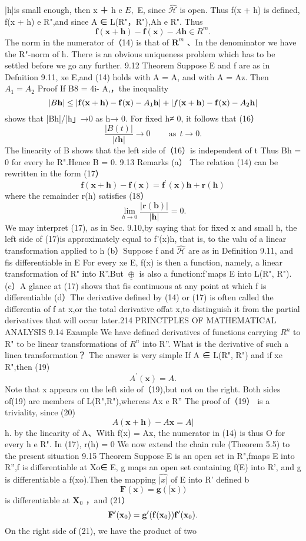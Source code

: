 |h|is small enough, then x ＋ h e $\textstyle E,$ E, since ${\widehat{\mathcal{H}}}$ is open. Thus f(x + h) is defined, f(x + h) e R",and since A ∈ L(R"，R"),Ah e R". Thus $$ \mathbf{f}(\mathbf{x}+\mathbf{h})-\mathbf{f}(\mathbf{x})-A\mathbf{h}\in R^{m}. $$ The norm in the numerator of（14) is that of ${\boldsymbol{R}}^{m}$ 、In the denominator we have the R"-norm of h. There is an obvious uniqueness problem which has to be settled before we go any further. 9.12 Theorem Suppose E and f are as in Defnition 9.11, xe E,and (14) holds with A = A, and with A = Az. Then $A_{1}=A_{2}$ Proof If B8 = 4i- A,，the incquality $$ |B{\bf h}|\leq|{\bf f}({\bf x}+{\bf h})-{\bf f}({\bf x})-A_{1}{\bf h}|+|f({\bf x}+{\bf h})-{\bf f}({\bf x})-A_{2}{\bf h}| $$ shows that |Bh|/|h」→0 as h→ 0. For fixed h≠ 0, it follows that (16） $$ {\frac{|B(t)|}{|t\mathbf{h}|}}\to0\qquad{\mathrm{~as~}}\ t\to0. $$ The linearity of B shows that the left side of（16）is independent of t Thus Bh = 0 for every he R".Hence B = 0. 9.13 Remarks (a） The relation (14) can be rewritten in the form (17） $$ \mathbf{f}(\mathbf{x}+\mathbf{h})-\mathbf{f}(\mathbf{x})=\mathbf{f}^{\prime}(\mathbf{x})\mathbf{h}+\mathbf{r}(\mathbf{h}) $$ where the remainder r(h) satisfies (18） $$ \operatorname*{lim}_{h\to0}{\frac{|\mathbf{r}(\mathbf{b})|}{|\mathbf{h}|}}=0. $$ We may interpret (17), as in Sec. 9.10,by saying that for fixed x and small h, the left side of (17)is approximately equal to f'(x)h, that is, to the valu of a linear transformation applied to h (b）Suppose f and ${\widehat{\mathcal{H}}}$ are as in Definition 9.11, and fis differentiable in E For every xe E, f(x) is then a function, namely, a linear transformation of R" into R”.But $\underline{{\oplus}}$ is also a function:f’maps E into L(R", R"). (c）A glance at (17) shows that fis continuous at any point at which f is differentiable (d）The derivative defined by (14) or (17) is often called the differentia of f at x,or the total derivative offat x,to distinguish it from the partial derivatives that will occur later.214 PRINCTPLES OF MATHEMATICAL ANALYSIS 9.14 Example We have defined derivatives of functions carrying $\textstyle R^{n}$ to R" to be linear transformations of $\textstyle R^{n}$ into R”. What is the derivative of such a linea transformation？ The answer is very simple If A ∈ L(R", R") and if xe R",then (19) $$ A^{\prime}(\mathbf{x})=A. $$ Note that x appears on the left side of（19),but not on the right. Both sides of(19) are members of L(R",R"),whereas Ax e R” The proof of（19） is a triviality, since (20) $$ A(\mathbf{x}+\mathbf{h})-A\mathbf{x}=A| $$ h. by the linearity of A、With f(x) = Ax, the numerator in (14) is thus O for every h e R". In (17), r(h) = 0 We now extend the chain rule (Theorem 5.5) to the present situation 9.15 Theorem Suppose E is an open set in R",fmaps E into R”,f is differentiable at Xo∈ E, g maps an open set containing f(E) into R', and g is differentiable a f(xo).Then the mapping ${\widehat{\left|x\right|}}$ of E into R' defined b $$ \mathbf{F}(\mathbf{x})=\mathbf{g}([\mathbf{x})) $$ is differentiable at $\mathbf{X}_{0}$ ，and (21） $$ {\bf F}^{\prime}({\bf x}_{0})={\bf g}^{\prime}({\bf f}({\bf x}_{0})){\bf f}^{\prime}({\bf x}_{0}). $$ On the right side of (21), we have the product of two 